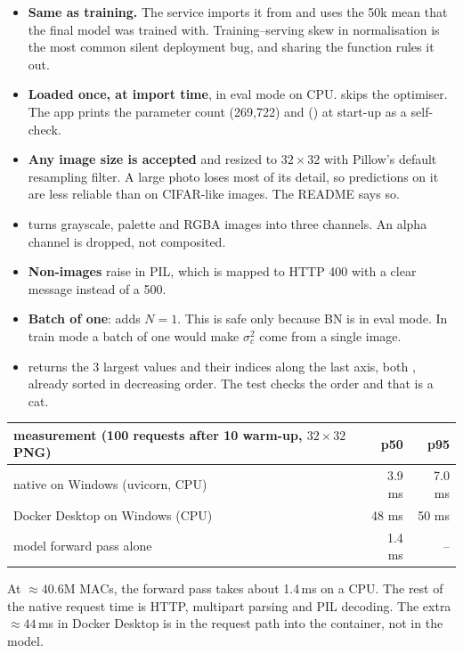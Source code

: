 \begin{repo}
\begin{itemize}[nosep]
  \item \textbf{Same  as training.} The service imports it from  and uses the 50k mean that the final model was trained with. Training--serving skew in normalisation is the most common silent deployment bug, and sharing the function rules it out.
  \item \textbf{Loaded once, at import time}, in eval mode on CPU.  skips the optimiser. The app prints the parameter count (269{,}722) and  () at start-up as a self-check.
  \item \textbf{Any image size is accepted} and resized to $32{\times}32$ with Pillow's default resampling filter. A large photo loses most of its detail, so predictions on it are less reliable than on CIFAR-like images. The README says so.
  \item \textbf{} turns grayscale, palette and RGBA images into three channels. An alpha channel is dropped, not composited.
  \item \textbf{Non-images} raise  in PIL, which is mapped to HTTP 400 with a clear message instead of a 500.
  \item \textbf{Batch of one}:  adds $N=1$. This is safe only because BN is in eval mode. In train mode a batch of one would make $\sigma^2_c$ come from a single image.
  \item \textbf{} returns the 3 largest values and their indices along the last axis, both , already sorted in decreasing order. The test  checks the order and that  is a cat.
\end{itemize}
\end{repo}

\begin{repo}
\begin{center}
\begin{tabular}{@{}lrr@{}}
\toprule
measurement (100 requests after 10 warm-up, $32{\times}32$ PNG) & p50 & p95\\
\midrule
native on Windows (uvicorn, CPU) & 3.9 ms & 7.0 ms\\
Docker Desktop on Windows (CPU) & 48 ms & 50 ms\\
model forward pass alone & 1.4 ms & --\\
\bottomrule
\end{tabular}
\end{center}
At $\approx40.6$M MACs, the forward pass takes about 1.4\,ms on a CPU. The rest of the native request time is HTTP, multipart parsing and PIL decoding. The extra $\approx44$\,ms in Docker Desktop is in the request path into the container, not in the model.
\end{repo}

